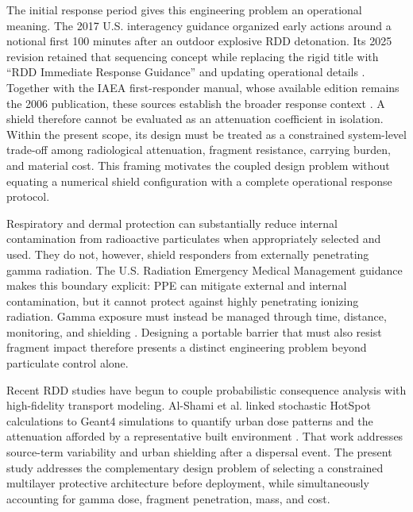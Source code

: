 \documentclass[12pt]{elsarticle}
\begin{document}
	The initial response period gives this engineering problem an operational meaning. The 2017 U.S. interagency guidance organized early actions around a notional first 100 minutes after an outdoor explosive RDD detonation. Its 2025 revision retained that sequencing concept while replacing the rigid title with “RDD Immediate Response Guidance” and updating operational details \cite{DHS2017RDD,DHS2025RDD}. Together with the IAEA first-responder manual, whose available edition remains the 2006 publication, these sources establish the broader response context \cite{IAEA2006FirstResponders}. A shield therefore cannot be evaluated as an attenuation coefficient in isolation. Within the present scope, its design must be treated as a constrained system-level trade-off among radiological attenuation, fragment resistance, carrying burden, and material cost. This framing motivates the coupled design problem without equating a numerical shield configuration with a complete operational response protocol.

	Respiratory and dermal protection can substantially reduce internal contamination from radioactive particulates when appropriately selected and used. They do not, however, shield responders from externally penetrating gamma radiation. The U.S. Radiation Emergency Medical Management guidance makes this boundary explicit: PPE can mitigate external and internal contamination, but it cannot protect against highly penetrating ionizing radiation. Gamma exposure must instead be managed through time, distance, monitoring, and shielding \cite{REMM2026PPE,OSHA2026Radiation,CDC2026RadiationSafety}. Designing a portable barrier that must also resist fragment impact therefore presents a distinct engineering problem beyond particulate control alone.

	Recent RDD studies have begun to couple probabilistic consequence analysis with high-fidelity transport modeling. Al-Shami et al. linked stochastic HotSpot calculations to Geant4 simulations to quantify urban dose patterns and the attenuation afforded by a representative built environment \cite{AlShami2026}. That work addresses source-term variability and urban shielding after a dispersal event. The present study addresses the complementary design problem of selecting a constrained multilayer protective architecture before deployment, while simultaneously accounting for gamma dose, fragment penetration, mass, and cost.
\end{document}
